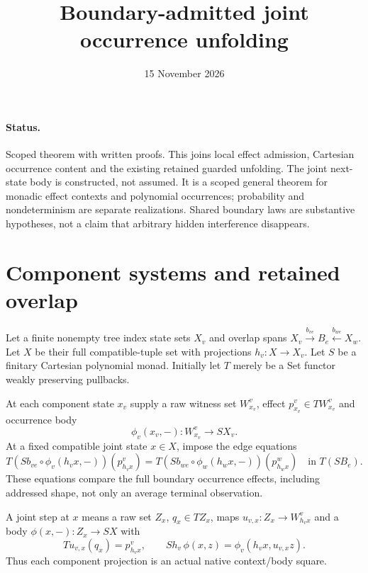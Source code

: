 \documentclass[11pt]{article}
\title{Boundary-admitted joint occurrence unfolding}
\date{15 November 2026}
\begin{document}
\maketitle
\paragraph{Status.} Scoped theorem with written proofs. This joins local effect admission, Cartesian occurrence content and the existing retained guarded unfolding. The joint next-state body is constructed, not assumed. It is a scoped general theorem for monadic effect contexts and polynomial occurrences; probability and nondeterminism are separate realizations. Shared boundary laws are substantive hypotheses, not a claim that arbitrary hidden interference disappears.

\section{Component systems and retained overlap}
Let a finite nonempty tree index state sets $X_v$ and overlap spans $X_v\xrightarrow{b_{ve}}B_e\xleftarrow{b_{we}}X_w$. Let $X$ be their full compatible-tuple set with projections $h_v:X\to X_v$. Let $S$ be a finitary Cartesian polynomial monad. Initially let $T$ merely be a Set functor weakly preserving pullbacks.

At each component state $x_v$ supply a raw witness set $W^v_{x_v}$, effect $p^v_{x_v}\in T W^v_{x_v}$ and occurrence body
\[
 \phi_v(x_v,-):W^v_{x_v}\to S X_v.
\]
At a fixed compatible joint state $x\in X$, impose the edge equations
\[
 T(Sb_{ve}\circ\phi_v(h_vx,-))(p^v_{h_vx})
 =T(Sb_{we}\circ\phi_w(h_wx,-))(p^w_{h_wx})
 \quad\text{in }T(SB_e).
\tag{E}
\]
These equations compare the full boundary occurrence effects, including addressed shape, not only an average terminal observation.

A joint step at $x$ means a raw set $Z_x$, $q_x\in TZ_x$, maps $u_{v,x}:Z_x\to W^v_{h_vx}$ and a body $\phi(x,-):Z_x\to SX$ with
\[
 Tu_{v,x}(q_x)=p^v_{h_vx},\qquad
 Sh_v\,\phi(x,z)=\phi_v(h_vx,u_{v,x}z).
\tag{N}
\]
Thus each component projection is an actual native context/body square.
\end{document}
